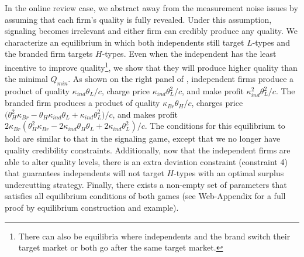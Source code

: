 \documentclass[mksc,blindrev]{informs3} %
\begin{document}
In the online review case, we abstract away from the measurement noise issues by assuming that each firm’s quality is fully revealed. Under this assumption, signaling becomes irrelevant and either firm can credibly produce any quality. We characterize an equilibrium in which both independents still target $L$-types and the branded firm targets $H$-types. Even when the independent has the least incentive to improve quality\footnote{There can also be equilibria where independents and the brand switch their target market or both go after the same target market.}, we show that they will produce higher quality than the minimal $Q_{min}$. As shown on the right panel of , independent firms produce a product of quality $\kappa_{ind}\theta_L/c$, charge price $\kappa_{ind}\theta_L^2/c$, and make profit $\kappa_{ind}^2\theta_L^2/c$. The branded firm produces a product of quality $\kappa_{Br}\theta_H/c$, charges price $\big(\theta_H^2 \kappa_{Br}-\theta_H \kappa_{ind} \theta_L+\kappa_{ind} \theta_L^2\big)/c$, and makes profit $2 \kappa_{Br} (\theta_H^2 \kappa_{Br}-2 \kappa_{ind} \theta_H \theta_L+2 \kappa_{ind} \theta_L^2)/c$. The conditions for this equilibrium to hold are similar to that in the signaling game, except that we no longer have quality credibility constraints. Additionally, now that the independent firms are able to alter quality levels, there is an extra deviation constraint (constraint 4) that guarantees independents will not target $H$-types with an optimal surplus undercutting strategy. Finally, there exists a non-empty set of parameters that satisfies all equilibrium conditions of both games (see Web-Appendix for a full proof by equilibrium construction and example).
\end{document}
